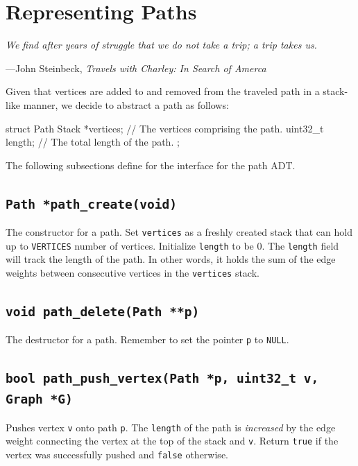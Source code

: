 \documentclass[11pt]{article}
\begin{document}
\section{Representing Paths}

\textwidth \epigraph{\emph{We find after years of
struggle that we do not take a trip; a trip takes us.} }{---John
Steinbeck, \emph{Travels with Charley: In Search of Amerca}}

Given that vertices are added to and removed from the traveled path in a
stack-like manner, we decide to abstract a path as follows:

\begin{codelisting}{}
struct Path {
  Stack *vertices; // The vertices comprising the path.
  uint32_t length; // The total length of the path.
};
\end{codelisting}


The following subsections define for the interface for the path ADT.

\subsection{\texttt{Path *path\_create(void)}}

The constructor for a path. Set \texttt{vertices} as a freshly created
stack that can hold up to \texttt{VERTICES} number of vertices.
Initialize \texttt{length} to be 0. The \texttt{length} field will track
the length of the path. In other words, it holds the sum of the edge
weights between consecutive vertices in the \texttt{vertices} stack.

\subsection{\texttt{void path\_delete(Path **p)}}

The destructor for a path. Remember to set the pointer \texttt{p} to
\texttt{NULL}.

\subsection{\texttt{bool path\_push\_vertex(Path *p, uint32\_t v, Graph
*G)}}

Pushes vertex \texttt{v} onto path \texttt{p}. The \texttt{length} of the
path is \emph{increased} by the edge weight connecting the vertex at the top of
the stack and \texttt{v}. Return \texttt{true} if the vertex was
successfully pushed and \texttt{false} otherwise.
\end{document}
